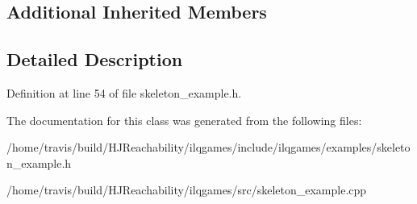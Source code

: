 \subsection*{Additional Inherited Members}


\subsection{Detailed Description}


Definition at line 54 of file skeleton\+\_\+example.\+h.



The documentation for this class was generated from the following files\+:\begin{DoxyCompactItemize}
\item 
/home/travis/build/\+H\+J\+Reachability/ilqgames/include/ilqgames/examples/skeleton\+\_\+example.\+h\item 
/home/travis/build/\+H\+J\+Reachability/ilqgames/src/skeleton\+\_\+example.\+cpp\end{DoxyCompactItemize}
